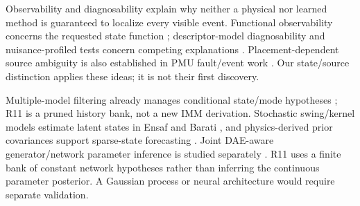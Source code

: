 Observability and diagnosability explain why neither a physical nor learned method is guaranteed to localize every visible event. Functional observability concerns the requested state function \cite{fernando2010functional,montanari2022functional}; descriptor-model diagnosability and nuisance-profiled tests concern competing explanations \cite{eriksson2013diagnosability,scharf1994matched}. Placement-dependent source ambiguity is also established in PMU fault/event work \cite{jamei2020limits,conte2023fault,yildiz2025sparse}. Our state/source distinction applies these ideas; it is not their first discovery.

Multiple-model filtering already manages conditional state/mode hypotheses \cite{blom1988imm}; R11 is a pruned history bank, not a new IMM derivation. Stochastic swing/kernel models estimate latent states in Ensaf and Barati \cite{ensaf2023kernel}, and physics-derived prior covariances support sparse-state forecasting \cite{tartakovsky2023gp}. Joint DAE-aware generator/network parameter inference is studied separately \cite{albustami2026dae}. R11 uses a finite bank of constant network hypotheses rather than inferring the continuous parameter posterior. A Gaussian process or neural architecture would require separate validation.

